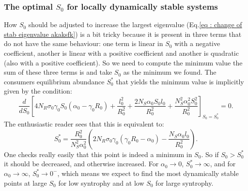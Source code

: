 \documentclass[12pt, titlepage, twoside, openright]{report}
\begin{document}
  \subsubsection{The optimal \texorpdfstring{$S_0$}{S0} for locally dynamically stable systems} \label{sec: appendix how to handle S0}
  How $S_0$ should be adjusted to increase the largest eigenvalue (Eq.\ref{eq : change of stab eigenvalue akaksfk}) is a bit tricky because it is present in three terms that do not have the same behaviour: one term is linear in $S_0$ with a negative coefficient, another is linear with a positive coefficient and another is quadratic (also with a positive coefficient). So we need to compute the minimum value the sum of these three terms is and take $S_0$ as the minimum we found. The consumers equilibrium abundance $S_0^*$ that yields the minimum value is implicitly given by the condition:
  \begin{equation}
  \frac{d}{dS_0} \left[4N_R \sigma_0 \gamma_0 S_0  (\alpha_0 - \gamma_0 R_0) +\frac{l_0^2}{R_0^2}+\frac{2N_S\alpha_0 S_0 l_0}{R_0^2} + \frac{N_S^2 \alpha_0^2 S_0^2}{R_0^2}\right]_{S_0=S_0^*}=0.
  \end{equation}
  The enthusiastic reader sees that this is equivalent to:
  \begin{equation}
  S_0^* = \frac{R_0^2}{N_S^2 \alpha_0^2}\left(2N_R\sigma_0 \gamma_0\left(\gamma_0R_0-\alpha_0\right)-\frac{N_S \alpha_0 l_0}{R_0^2}\right).
  \end{equation}
  One checks really easily that this point is indeed a minimum in $S_0$. So if $S_0 > S_0^*$ it should be decreased, and otherwise increased. For $\alpha_0 \rightarrow 0$, $S_0^* \rightarrow \infty$, and for $\alpha_0 \rightarrow \infty$, $S_0^* \rightarrow 0^-$, which means we expect to find the most dynamically stable points at large $S_0$ for low syntrophy and at low $S_0$ for large syntrophy.
\end{document}
